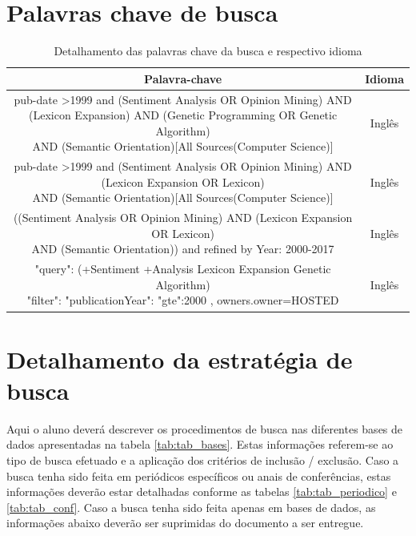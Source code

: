 \documentclass[a4paper,11pt]{article}
\begin{document}
\section{Palavras chave de busca}
\begin{table}[h]
\centering
\begin{tabular}{| c | c |}
\hline
\textbf{Palavra-chave} & \textbf{Idioma} \\
\hline
\makecell{pub-date \textgreater 1999 and (Sentiment Analysis OR Opinion Mining) AND \\ (Lexicon Expansion) AND (Genetic Programming OR Genetic Algorithm) \\ AND (Semantic Orientation)[All Sources(Computer Science)]} & Inglês \\
\hline
\makecell{pub-date \textgreater 1999 and (Sentiment Analysis OR Opinion Mining) AND \\ (Lexicon Expansion OR Lexicon) \\ AND (Semantic Orientation)[All Sources(Computer Science)]} & Inglês \\
\hline
\makecell{((Sentiment Analysis OR Opinion Mining) AND (Lexicon Expansion OR Lexicon) \\ AND (Semantic Orientation))  and refined by Year: 2000-2017} & Inglês \\
\hline
\makecell{"query": { (+Sentiment +Analysis Lexicon Expansion Genetic Algorithm) } \\ "filter": {"publicationYear":{ "gte":2000 }},
{owners.owner=HOSTED}} & Inglês \\
\hline
\end{tabular}
\caption{Detalhamento das palavras chave da busca e respectivo idioma}
\label{tab:tab_palchaves}
\end{table}
 
\section{Detalhamento da estratégia de busca}
 Aqui o aluno deverá descrever os procedimentos de busca nas diferentes bases de dados apresentadas na tabela \ref{tab:tab_bases}. Estas informações referem-se  ao tipo de busca efetuado e a aplicação dos critérios de inclusão / exclusão. Caso a busca tenha sido feita em periódicos específicos ou anais de conferências, estas informações deverão estar detalhadas conforme as tabelas \ref{tab:tab_periodico} e  \ref{tab:tab_conf}. Caso a busca tenha sido feita apenas em bases de dados, as informações abaixo deverão ser suprimidas do documento a ser entregue.
 
\end{document}
